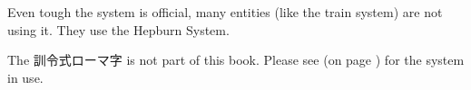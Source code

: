 
Even tough the system is official, many entities (like the train system) are
not using it. They use the Hepburn System.

The {訓令式ローマ字} is not part of this book. Please see 
(on page \pageref{sec:Hepburn}) for the system in use.
